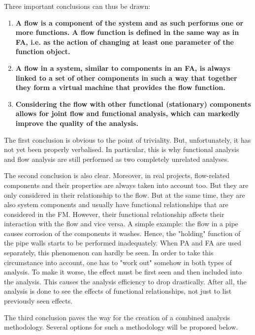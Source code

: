 \documentclass[a4paper,11pt]{article}
\begin{document}
Three important conclusions can thus be drawn:
\begin{enumerate}
\item \textbf{A flow is a component of the system and as such performs one or
  more functions. A flow function is defined in the same way as in FA, i.e. as
  the action of changing at least one parameter of the function object.}
\item \textbf{A flow in a system, similar to components in an FA, is always
  linked to a set of other components in such a way that together they form a
  virtual machine that provides the flow function.}
\item \textbf{Considering the flow with other functional (stationary)
  components allows for joint flow and functional analysis, which can markedly
  improve the quality of the analysis.}
\end{enumerate}
The first conclusion is obvious to the point of triviality. But,
unfortunately, it has not yet been properly verbalised. In particular, this is
why functional analysis and flow analysis are still performed as two
completely unrelated analyses.

The second conclusion is also clear. Moreover, in real projects, flow-related
components and their properties are always taken into account too. But they
are only considered in their relationship to the flow. But at the same time,
they are also system components and usually have functional relationships that
are considered in the FM. However, their functional relationship affects their
interaction with the flow and vice versa. A simple example: the flow in a pipe
causes corrosion of the components it washes. Hence, the "holding" function of
the pipe walls starts to be performed inadequately. When PA and FA are used
separately, this phenomenon can hardly be seen. In order to take this
circumstance into account, one has to "work out" somehow in both types of
analysis. To make it worse, the effect must be first seen and then included
into the analysis. This causes the analysis efficiency to drop drastically.
After all, the analysis is done to see the effects of functional
relationships, not just to list previously seen effects.

The third conclusion paves the way for the creation of a combined analysis
methodology. Several options for such a methodology will be proposed below.
\end{document}
